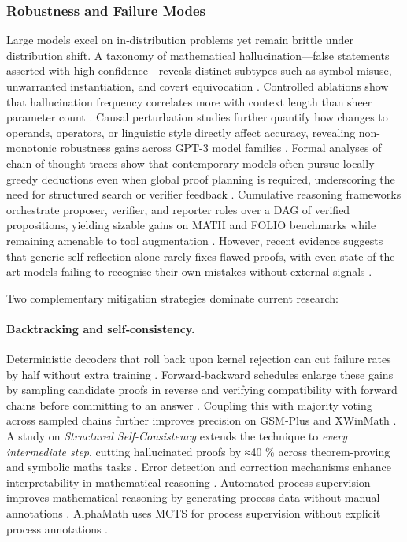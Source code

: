 \documentclass[acmsmall,anonymous]{acmart}
\begin{document}
\subsubsection{Robustness and Failure Modes}\label{sec:robust}
Large models excel on in‐distribution problems yet remain brittle under distribution shift.  A taxonomy of mathematical hallucination—false statements asserted with high confidence—reveals distinct subtypes such as symbol misuse, unwarranted instantiation, and covert equivocation \cite{sun2024benchmarking}.  Controlled ablations show that hallucination frequency correlates more with context length than sheer parameter count \cite{yang2023steamroller}.  Causal perturbation studies further quantify how changes to operands, operators, or linguistic style directly affect accuracy, revealing non-monotonic robustness gains across GPT-3 model families \cite{stolfo-2023-causal}.  Formal analyses of chain-of-thought traces show that contemporary models often pursue locally greedy deductions even when global proof planning is required, underscoring the need for structured search or verifier feedback \cite{saparov-2023-greedy}.  Cumulative reasoning frameworks orchestrate proposer, verifier, and reporter roles over a DAG of verified propositions, yielding sizable gains on MATH and FOLIO benchmarks while remaining amenable to tool augmentation \cite{zhang-2025-cumulative-reasoning}.  However, recent evidence suggests that generic self-reflection alone rarely fixes flawed proofs, with even state-of-the-art models failing to recognise their own mistakes without external signals \cite{huang-2024-llm-self-correct}.  

Two complementary mitigation strategies dominate current research:

\paragraph{Backtracking and self‐consistency.}
Deterministic decoders that roll back upon kernel rejection can cut failure rates by half without extra training \cite{lee2024backtracking}.  Forward-backward schedules enlarge these gains by sampling candidate proofs in reverse and verifying compatibility with forward chains before committing to an answer \cite{jiang-2024-forward-backward}.  Coupling this with majority voting across sampled chains further improves precision on GSM‐Plus and XWinMath \cite{li2024mugglemath}. A study on \emph{Structured Self-Consistency} extends the
  technique to \emph{every intermediate step}, cutting
  hallucinated proofs by ≈40 \% across theorem-proving and symbolic
  maths tasks \cite{Liu2025SC}. Error detection and correction mechanisms enhance interpretability in mathematical reasoning \cite{leiva2025errordetection,anonymous2025errordetection}. Automated process supervision improves mathematical reasoning by generating process data without manual annotations \cite{luo2024improve}. AlphaMath uses MCTS for process supervision without explicit process annotations \cite{wang2024 d alpha}.
\end{document}
